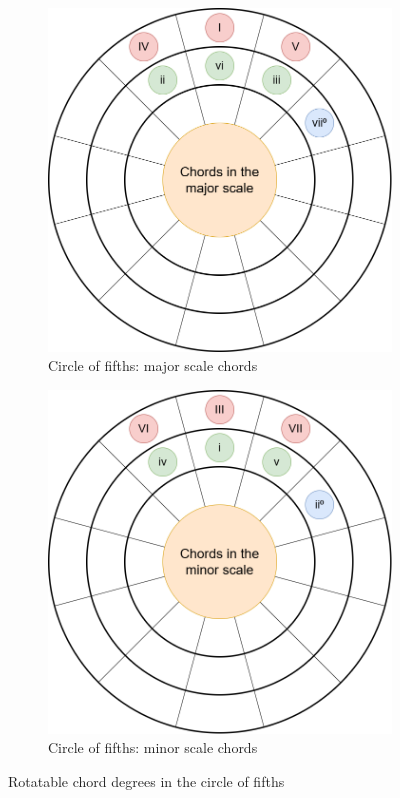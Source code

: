 \begin{figure}[h]
	\centering
	\begin{subfigure}{0.47\textwidth}
		\includegraphics[width=\textwidth]{../../Images/CircleOfFifthsChordsInTheMajorScale.png}
		\caption{Circle of fifths: major scale chords}
		\label{fig:circle_of_fifths_major_scale_chords}
	\end{subfigure}
	\hfill
	\begin{subfigure}{0.47\textwidth}
		\includegraphics[width=\textwidth]{../../Images/CircleOfFifthsChordsInTheMinorScale.png}
		\caption{Circle of fifths: minor scale chords}
		\label{fig:circle_of_fifths_minor_scale_chords}
	\end{subfigure}
	\caption{Rotatable chord degrees in the circle of fifths}
\end{figure}

